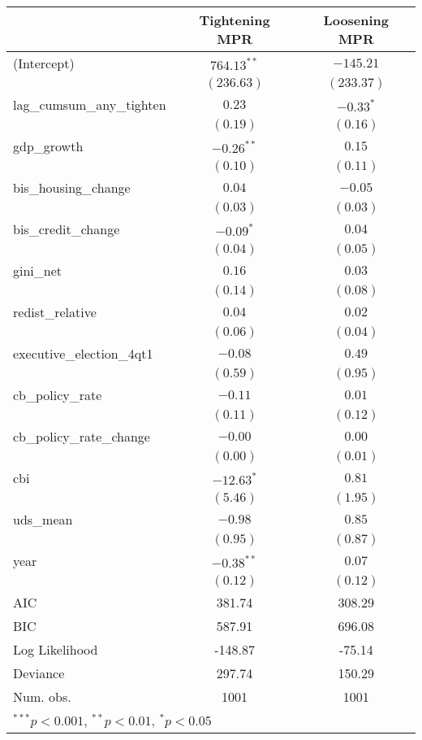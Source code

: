 
\begin{tabular}{l c c }
\hline
 & Tightening MPR & Loosening MPR \\
\hline
(Intercept)               & $764.13^{**}$ & $-145.21$   \\
                          & $(236.63)$    & $(233.37)$  \\
lag\_cumsum\_any\_tighten & $0.23$        & $-0.33^{*}$ \\
                          & $(0.19)$      & $(0.16)$    \\
gdp\_growth               & $-0.26^{**}$  & $0.15$      \\
                          & $(0.10)$      & $(0.11)$    \\
bis\_housing\_change      & $0.04$        & $-0.05$     \\
                          & $(0.03)$      & $(0.03)$    \\
bis\_credit\_change       & $-0.09^{*}$   & $0.04$      \\
                          & $(0.04)$      & $(0.05)$    \\
gini\_net                 & $0.16$        & $0.03$      \\
                          & $(0.14)$      & $(0.08)$    \\
redist\_relative          & $0.04$        & $0.02$      \\
                          & $(0.06)$      & $(0.04)$    \\
executive\_election\_4qt1 & $-0.08$       & $0.49$      \\
                          & $(0.59)$      & $(0.95)$    \\
cb\_policy\_rate          & $-0.11$       & $0.01$      \\
                          & $(0.11)$      & $(0.12)$    \\
cb\_policy\_rate\_change  & $-0.00$       & $0.00$      \\
                          & $(0.00)$      & $(0.01)$    \\
cbi                       & $-12.63^{*}$  & $0.81$      \\
                          & $(5.46)$      & $(1.95)$    \\
uds\_mean                 & $-0.98$       & $0.85$      \\
                          & $(0.95)$      & $(0.87)$    \\
year                      & $-0.38^{**}$  & $0.07$      \\
                          & $(0.12)$      & $(0.12)$    \\
\hline
AIC                       & 381.74        & 308.29      \\
BIC                       & 587.91        & 696.08      \\
Log Likelihood            & -148.87       & -75.14      \\
Deviance                  & 297.74        & 150.29      \\
Num. obs.                 & 1001          & 1001        \\
\hline
\multicolumn{3}{l}{\scriptsize{$^{***}p<0.001$, $^{**}p<0.01$, $^*p<0.05$}}
\end{tabular}
